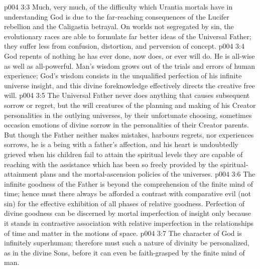 \vs p004 3:3 \pc Much, very much, of the difficulty which Urantia mortals have in understanding God is due to the far\hyp{}reaching consequences of the Lucifer rebellion and the Caligastia betrayal. On worlds not segregated by sin, the evolutionary races are able to formulate far better ideas of the Universal Father; they suffer less from confusion, distortion, and perversion of concept.
\vs p004 3:4 \pc God repents of nothing he has ever done, now does, or ever will do. He is all\hyp{}wise as well as all\hyp{}powerful. Man’s wisdom grows out of the trials and errors of human experience; God’s wisdom consists in the unqualified perfection of his infinite universe insight, and this divine foreknowledge effectively directs the creative free will.
\vs p004 3:5 The Universal Father never does anything that causes subsequent sorrow or regret, but the will creatures of the planning and making of his Creator personalities in the outlying universes, by their unfortunate choosing, sometimes occasion emotions of divine sorrow in the personalities of their Creator parents. But though the Father neither makes mistakes, harbours regrets, nor experiences sorrows, he is a being with a father’s affection, and his heart is undoubtedly grieved when his children fail to attain the spiritual levels they are capable of reaching with the assistance which has been so freely provided by the spiritual\hyp{}attainment plans and the mortal\hyp{}ascension policies of the universes.
\vs p004 3:6 The infinite goodness of the Father is beyond the comprehension of the finite mind of time; hence must there always be afforded a contrast with comparative evil (not sin) for the effective exhibition of all phases of relative goodness. Perfection of divine goodness can be discerned by mortal imperfection of insight only because it stands in contrastive association with relative imperfection in the relationships of time and matter in the motions of space.
\vs p004 3:7 The character of God is infinitely superhuman; therefore must such a nature of divinity be personalized, as in the divine Sons, before it can even be faith\hyp{}grasped by the finite mind of man.
